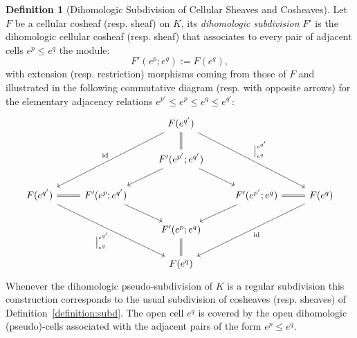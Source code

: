 \documentclass[10pt]{amsart}
\theoremstyle{definition}
\newtheorem{defi}[theo]{Definition}
\numberwithin{equation}{section}
\numberwithin{figure}{section}
\DeclareMathOperator{\id}{id}
\begin{document}
\begin{defi}[Dihomologic Subdivision of Cellular Sheaves and Cosheaves]
Let $F$ be a cellular cosheaf (resp. sheaf) on $K$, its \emph{dihomologic subdivision} $F'$ is the dihomologic cellular cosheaf (resp. sheaf) that associates to every pair of adjacent cells $e^p\leq e^q$ the module:
\begin{equation*}
F'(e^p;e^q):=F(e^q),
\end{equation*}
with extension (resp. restriction) morphisms coming from those of $F$ and illustrated in the following commutative diagram (resp. with opposite arrows) for the elementary adjacency relations $e^{p'}\leq e^{p}\leq e^{q}\leq e^{q'}$:
\begin{equation*}
\begin{tikzcd}
& & F(e^{q'}) \arrow[ddll,"\id" above left] \arrow[ddrr,"\big|^{e^{q'}}_{e^q}"] \arrow[d,equal] & & \\%
& & F'(e^{p'};e^{q'}) \arrow[dr] \arrow[dl] & & \\%
F(e^{q'})\arrow[ddrr,"\big|^{e^{q'}}_{e^q}" below left] \arrow[r,equal] & F'(e^{p};e^{q'}) \arrow[dr] & & F'(e^{p'};e^{q}) \arrow[dl] \arrow[r,equal] & F(e^q) \arrow[ddll,"\id"] \\%
& & F'(e^{p};e^{q}) \arrow[d,equal] & & \\%
& & F(e^q) & &
\end{tikzcd}
\end{equation*}
Whenever the dihomologic pseudo-subdivision of $K$ is a regular subdivision this construction corresponds to the usual subdivision of cosheaves (resp. sheaves) of Definition~\ref{definition:subd}. The open cell $e^q$ is covered by the open dihomologic (pseudo)-cells associated with the adjacent pairs of the form $e^p\leq e^q$.
\end{defi}
\end{document}
